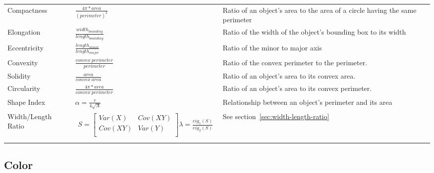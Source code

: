 \documentclass[letterpaper]{article}
\begin{document}
{{\begin{longtable}{x{\dimexpr.15\tabcolsep}
                  x{\dimexpr.425\tabcolsep}
                  x{\dimexpr.425\tabcolsep}}
		Compactness      
		& \begin{minipage}[t]{0.3\textwidth}
			$\frac{4\pi * area}{(perimeter)^2}$ 
		   \end{minipage}
		& Ratio of an object's area to the area of a circle having the same perimeter 
\tabularnewline\addlinespace

		Elongation      
		& $\frac{width_{bounding}}{length_{bounding}}$ 
		& Ratio of the width of the object's bounding box to its width
\tabularnewline\addlinespace

		Eccentricity      
		& $\frac{length_{minor}}{length_{major}}$
		& Ratio of the minor to major axis
\tabularnewline\addlinespace

		Convexity   
		& $\frac{convex~perimeter}{perimeter}$ 
		& Ratio of the convex perimeter to the perimeter.
\tabularnewline\addlinespace

		Solidity    
		& $\frac{area}{convex~area}$ 
		&  Ratio of an object's area to its convex area. 
\tabularnewline\addlinespace

		Circularity    
		& $\frac{4\pi * area}{convex~perimeter}$ 
		& Ratio of an object's area to its convex perimeter. 
\tabularnewline\addlinespace


		Shape Index    
		& $\alpha = \frac {e} {4 \sqrt{A}}$ 
		&  Relationship between an object's perimeter and its area
\tabularnewline\addlinespace

		Width/Length Ratio
		& \begin{minipage}[h]{0.10\textwidth}
			\begin{eqnarray*}
				S = 
				\begin{bmatrix}
					Var(X) & Cov(XY) \\[0.10em]
					Cov(XY) & Var(Y) \\[0.10em]
				\end{bmatrix}
			\lambda = \frac {eig_{1}(S)} {eig_{2}(S)}
			\end{eqnarray*}
		  \end{minipage}
		& See section~\ref{sec:width-length-ratio}
\tabularnewline\addlinespace

\label{table:shape-formulae}
\end{longtable}
}

%
%
\subsection{Color}
}
\end{document}

